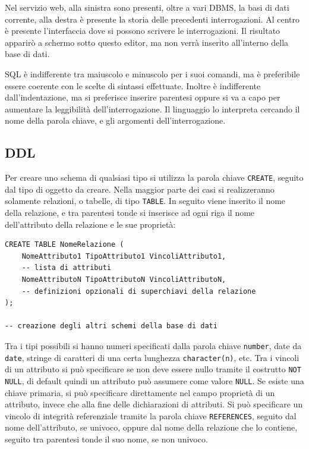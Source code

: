 \documentclass{article}
\numberwithin{equation}{subsection}
\begin{document}
Nel servizio web, alla sinistra sono presenti, oltre a vari DBMS, la basi di dati corrente, alla destra è presente la storia delle precedenti interrogazioni. Al centro è presente l'interfaccia dove si possono 
scrivere le interrogazioni. Il risultato apparirò a schermo sotto questo editor, ma non verrà inserito all'interno della base di dati. 


SQL è indifferente tra maiuscolo e minuscolo per i suoi comandi, ma è preferibile essere coerente con le scelte di sintassi effettuate. Inoltre è indifferente 
dall'indentazione, ma si preferisce inserire parentesi oppure si va a capo per aumentare la leggibilità dell'interrogazione. Il linguaggio lo 
interpreta cercando il nome della parola chiave, e gli argomenti dell'interrogazione.  


\subsection{DDL}

Per creare uno schema di qualsiasi tipo si utilizza la parola chiave \verb|CREATE|, seguito dal tipo di oggetto da creare. Nella maggior parte dei casi si realizzeranno solamente relazioni, o tabelle, di tipo 
\verb|TABLE|. In seguito viene inserito il nome della relazione, e tra parentesi tonde si inserisce ad ogni riga il nome dell'attributo della relazione e le sue proprietà:
\begin{verbatim}
CREATE TABLE NomeRelazione (
    NomeAttributo1 TipoAttributo1 VincoliAttributo1, 
    -- lista di attributi
    NomeAttributoN TipoAttributoN VincoliAttributoN,
    -- definizioni opzionali di superchiavi della relazione
);
    
-- creazione degli altri schemi della base di dati
\end{verbatim}

Tra i tipi possibili si hanno numeri specificati dalla parola chiave \verb|number|, date da \verb|date|, stringe di caratteri di una certa lunghezza \verb|character(n)|, etc. Tra i vincoli di un attributo si 
può specificare se non deve essere nullo tramite il costrutto \verb|NOT NULL|, di default quindi un attributo può assumere come valore \verb|NULL|. Se esiste una chiave primaria, si può specificare direttamente nel 
campo proprietà di un attributo, invece che alla fine delle dichiarazioni di attributi. Si può specificare un vincolo di integrità referenziale tramite la parola chiave \verb|REFERENCES|, seguito dal nome dell'attributo, 
se univoco, oppure dal nome della relazione che lo contiene, seguito tra parentesi tonde il suo nome, se non univoco. 
\end{document}
